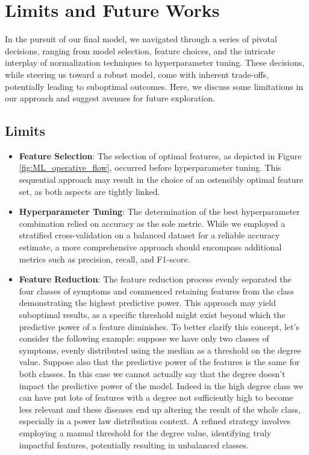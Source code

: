 \section{Limits and Future Works}

In the pursuit of our final model, we navigated through a series of pivotal decisions, ranging from model selection, feature choices, 
and the intricate interplay of normalization techniques to hyperparameter tuning. These decisions, while steering us toward a robust model, 
come with inherent trade-offs, potentially leading to suboptimal outcomes. Here, we discuss some limitations in our approach and suggest 
avenues for future exploration.

\subsection{Limits}

\begin{itemize}
\item \textbf{Feature Selection}: The selection of optimal features, as depicted in Figure \ref{fig:ML_operative_flow}, occurred 
before hyperparameter tuning. This sequential approach may result in the choice of an ostensibly optimal feature set, 
as both aspects are tightly linked.

\item \textbf{Hyperparameter Tuning}: The determination of the best hyperparameter combination relied on accuracy as 
the sole metric. While we employed a stratified cross-validation on a balanced dataset for a reliable accuracy estimate, 
a more comprehensive approach should encompass additional metrics such as precision, recall, and F1-score.

\item \textbf{Feature Reduction}: The feature reduction process evenly separated the four classes of symptoms and commenced 
retaining features from the class demonstrating the highest predictive power. This approach may yield suboptimal results, as a 
specific threshold might exist beyond which the predictive power of a feature diminishes. 
To better clarify this concept, let's consider the following example: suppose we have only two classes of symptoms, evenly distributed 
using the median as a threshold on the degree value. Suppose also that the predictive power of the features is the same for both classes.
In this case we cannot actually say that the degree doesn't impact the predictive power of the model. Indeed in the high degree class
we can have put lots of features with a degree not sufficiently high to become less relevant and these diseases end up
altering the result of the whole class, especially in a power law distribution context. 
A refined strategy involves employing a manual threshold for the degree value, identifying truly impactful features, 
potentially resulting in unbalanced classes.

\end{itemize}

